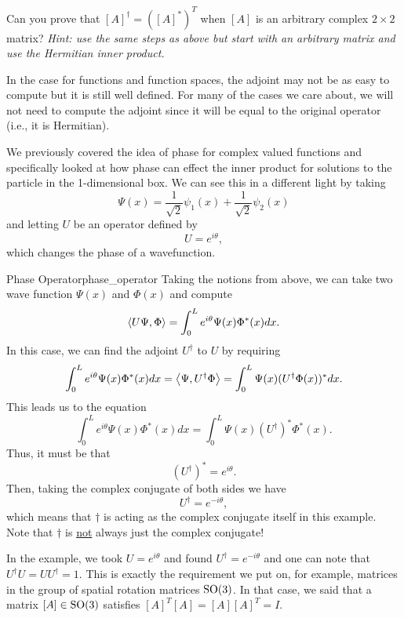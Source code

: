 \begin{exercise}
	Can you prove that $[A]^\dagger=\left([A]^*\right)^T$ when $[A]$ is an arbitrary complex $2\times 2$ matrix? \emph{Hint: use the same steps as above but start with an arbitrary matrix and use the Hermitian inner product.}
\end{exercise}

In the case for functions and function spaces, the adjoint may not be as easy to compute but it is still well defined.  For many of the cases we care about, we will not need to compute the adjoint since it will be equal to the original operator (i.e., it is Hermitian).  

We previously covered the idea of phase for complex valued functions and specifically looked at how phase can effect the inner product for solutions to the particle in the 1-dimensional box.  We can see this in a different light by taking
\[
\Psi(x) = \frac{1}{\sqrt{2}} \psi_1(x) + \frac{1}{\sqrt{2}} \psi_2(x)
\]
and letting $U$ be an operator defined by
\[
U = e^{i \theta},
\]
which changes the phase of a wavefunction.  

\begin{ex}{Phase Operator}{phase_operator}
	Taking the notions from above, we can take two wave function $\Psi(x)$ and $\Phi(x)$ and compute
	\[
	\left\langle U\Psi, \Phi \right\rangle = \int_0^L e^{i\theta} \Psi(x) \Phi^*(x)dx.
	\]
	In this case, we can find the adjoint $U^\dagger$ to $U$ by requiring
	\[
	\int_0^L e^{i\theta}\Psi(x)\Phi^*(x)dx = \left\langle \Psi, U^\dagger \Phi \right\rangle = \int_0^L \Psi(x) (U^\dagger \Phi(x))^*dx.
	\]
	This leads us to the equation
	\[
	\int_0^L e^{i\theta} \Psi(x) \Phi^*(x)dx = \int_0^L \Psi(x) (U^\dagger)^* \Phi^*(x).
	\]
	Thus, it must be that 
	\[
	(U^\dagger)^* = e^{i\theta}.
	\]
	Then, taking the complex conjugate of both sides we have
	\[
	U^\dagger = e^{-i\theta},
	\]
	which means that $\dagger$ is acting as the complex conjugate itself in this example.
Note that $\dagger$ is \underline{not} always just the complex conjugate! 
\end{ex}

In the example, we took $U=e^{i\theta}$ and found $U^\dagger = e^{-i\theta}$ and one can note that $U^\dagger U = U U^\dagger =1$. This is exactly the requirement we put on, for example, matrices in the group of spatial rotation matrices $\mathrm{SO}(3)$. In that case, we said that a matrix $[A]\in \mathrm{SO}(3)$ satisfies $[A]^T [A]=[A][A]^T = I$.  

